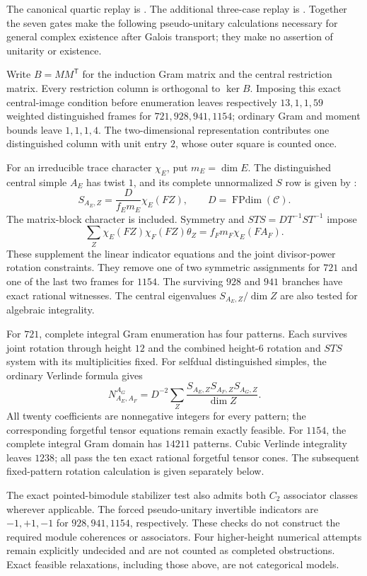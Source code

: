 The canonical quartic replay is
.
The additional three-case replay is
.
Together the seven gates make the following pseudo-unitary calculations
necessary for general complex existence after Galois transport; they
make no assertion of unitarity or existence.

Write $B=MM^{\mathsf T}$ for the induction Gram matrix and the central
restriction matrix. Every restriction column is orthogonal to
$\ker B$. Imposing this exact central-image condition before enumeration
leaves respectively $13,1,1,59$ weighted distinguished frames for
$721,928,941,1154$; ordinary Gram and moment bounds leave $1,1,1,4$.
The two-dimensional representation contributes one distinguished column
with unit entry $2$, whose outer square is counted once.

For an irreducible trace character $\chi_E$, put $m_E=\dim E$.
The distinguished central simple $A_E$ has twist $1$, and its complete
unnormalized $S$ row is given by \cite[Equation~(39)]{DeshpandeCenter}:
\[
 S_{A_E,Z}=\frac{D}{f_E m_E}\chi_E(FZ),\qquad D=\operatorname{FPdim}(\mathcal C).
\]
The matrix-block character is included. Symmetry and
$STS=DT^{-1}ST^{-1}$ impose
\[
 \sum_Z\chi_E(FZ)\chi_F(FZ)\theta_Z
 =f_Fm_F\chi_E(FA_F).
\]
These supplement the linear indicator equations and the joint
divisor-power rotation constraints. They remove one of two symmetric
assignments for $721$ and one of the last two frames for $1154$.
The surviving $928$ and $941$ branches have exact rational witnesses.
The central eigenvalues $S_{A_E,Z}/\dim Z$ are also tested for algebraic
integrality.

For $721$, complete integral Gram enumeration has four patterns.
Each survives joint rotation through height $12$ and the combined
height-$6$ rotation and $STS$ system with its multiplicities fixed.
For selfdual distinguished simples, the ordinary Verlinde formula gives
\[
 N_{A_E,A_F}^{A_G}
 =D^{-2}\sum_Z
 \frac{S_{A_E,Z}S_{A_F,Z}S_{A_G,Z}}{\dim Z}.
\]
All twenty coefficients are nonnegative integers for every pattern;
the corresponding forgetful tensor equations remain exactly feasible.
For $1154$, the complete integral Gram domain has $14211$ patterns.
Cubic Verlinde integrality leaves $1238$; all pass the ten exact rational
forgetful tensor cones. The subsequent fixed-pattern rotation calculation
is given separately below.

The exact pointed-bimodule stabilizer test also admits both $C_2$
associator classes wherever applicable. The forced pseudo-unitary
invertible indicators are $-1,+1,-1$ for $928,941,1154$, respectively.
These checks do not construct the required module coherences or
associators. Four higher-height numerical attempts remain explicitly
undecided and are not counted as completed obstructions. Exact feasible
relaxations, including those above, are not categorical models.


